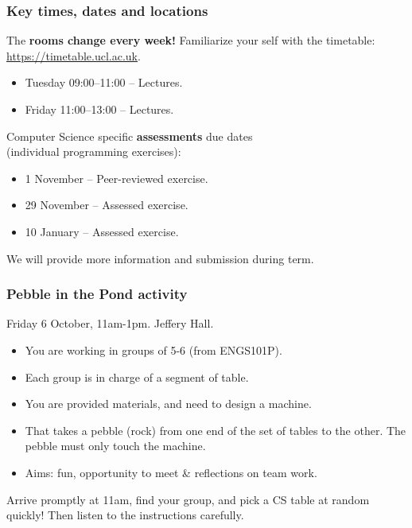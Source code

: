 \documentclass{beamer} %
\newcommand\emc[1]{\textcolor{brightblue}{\textbf{#1}}}
\begin{document}
\begin{frame}
\frametitle{Key times, dates and locations} 

The \emc{rooms change every week!}
Familiarize your self with the timetable: \url{https://timetable.ucl.ac.uk}.

\begin{itemize}
	\item Tuesday 09:00--11:00 -- Lectures.
	\item Friday 11:00--13:00 -- Lectures.
\end{itemize}

\vspace{3mm}
Computer Science specific \emc{assessments} due dates \\ (individual programming exercises):
\begin{itemize}
	\item 1 November -- Peer-reviewed exercise.
	\item 29 November -- Assessed exercise.
	\item 10 January -- Assessed exercise.
\end{itemize}
We will provide more information and submission during term.


\end{frame}

\begin{frame}
\frametitle{Pebble in the Pond activity} 

Friday 6 October, 11am-1pm. Jeffery Hall.

\begin{itemize}
	\item You are working in groups of 5-6 (from ENGS101P).
	\item Each group is in charge of a segment of table.
	\item You are provided materials, and need to design a machine.
	\item That takes a pebble (rock) from one end of the set of tables to the other. The pebble must only touch the machine.
	\item Aims: fun, opportunity to meet \& reflections on team work.
\end{itemize}

Arrive promptly at 11am, find your group, and pick a CS table at random quickly! Then listen to the instructions carefully.

\end{frame}
\end{document}
